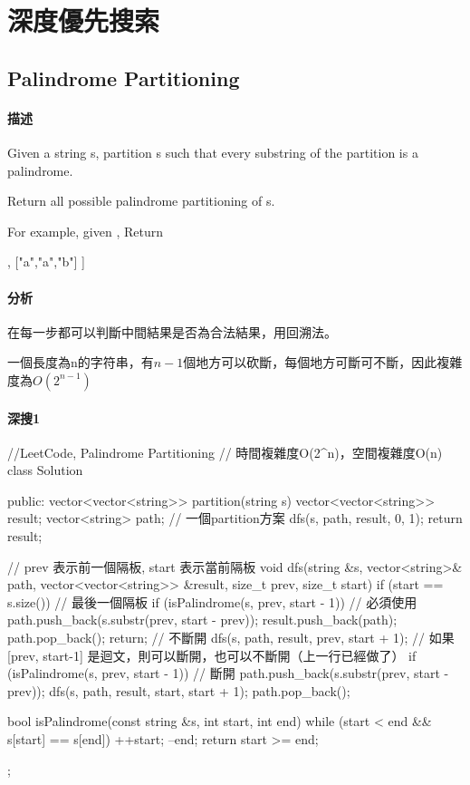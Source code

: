 \chapter{深度優先搜索}


\section{Palindrome Partitioning} %
\label{sec:palindrome-partitioning}


\subsubsection{描述}
Given a string s, partition s such that every substring of the partition is a palindrome.

Return all possible palindrome partitioning of s.

For example, given ,
Return
\begin{Code}
  [
    ["aa","b"],
    ["a","a","b"]
  ]
\end{Code}


\subsubsection{分析}
在每一步都可以判斷中間結果是否為合法結果，用回溯法。

一個長度為n的字符串，有$n-1$個地方可以砍斷，每個地方可斷可不斷，因此複雜度為$O(2^{n-1})$


\subsubsection{深搜1}
\begin{Code}
//LeetCode, Palindrome Partitioning
// 時間複雜度O(2^n)，空間複雜度O(n)
class Solution {
public:
    vector<vector<string>> partition(string s) {
        vector<vector<string>> result;
        vector<string> path;  // 一個partition方案
        dfs(s, path, result, 0, 1);
        return result;
    }

    // prev 表示前一個隔板, start 表示當前隔板
    void dfs(string &s, vector<string>& path,
            vector<vector<string>> &result, size_t prev, size_t start) {
        if (start == s.size()) { // 最後一個隔板
            if (isPalindrome(s, prev, start - 1)) { // 必須使用
                path.push_back(s.substr(prev, start - prev));
                result.push_back(path);
                path.pop_back();
            }
            return;
        }
        // 不斷開
        dfs(s, path, result, prev, start + 1);
        // 如果[prev, start-1] 是迴文，則可以斷開，也可以不斷開（上一行已經做了）
        if (isPalindrome(s, prev, start - 1)) {
            // 斷開
            path.push_back(s.substr(prev, start - prev));
            dfs(s, path, result, start, start + 1);
            path.pop_back();
        }
    }

    bool isPalindrome(const string &s, int start, int end) {
        while (start < end && s[start] == s[end]) {
            ++start;
            --end;
        }
        return start >= end;
    }
};
\end{Code}

